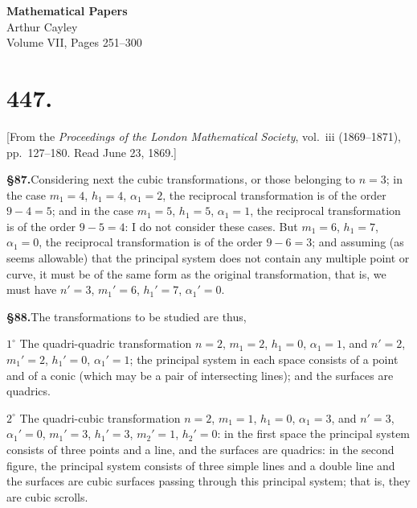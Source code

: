 \documentclass[11pt,a4paper]{article}
\begin{document}
\begin{center}
  {\LARGE\bfseries Mathematical Papers}\\[0.5em]
  {\Large Arthur Cayley}\\[1em]
  {\large Volume VII, Pages 251--300}
\end{center}

\vspace{2em}


\section*{\textbf{447.}}

[From the \textit{Proceedings of the London Mathematical Society}, vol.~iii (1869--1871), pp.~127--180. Read June 23, 1869.]

\textbf{\S 87.}\quad Considering next the cubic transformations, or those belonging to $n = 3$; in the case $m_1 = 4$, $h_1 = 4$, $\alpha_1 = 2$, the reciprocal transformation is of the order $9 - 4 = 5$; and in the case $m_1 = 5$, $h_1 = 5$, $\alpha_1 = 1$, the reciprocal transformation is of the order $9 - 5 = 4$: I do not consider these cases. But $m_1 = 6$, $h_1 = 7$, $\alpha_1 = 0$, the reciprocal transformation is of the order $9 - 6 = 3$; and assuming (as seems allowable) that the principal system does not contain any multiple point or curve, it must be of the same form as the original transformation, that is, we must have $n' = 3$, $m_1' = 6$, $h_1' = 7$, $\alpha_1' = 0$.

\textbf{\S 88.}\quad The transformations to be studied are thus,

$1^{\circ}$ The quadri-quadric transformation $n = 2$, $m_1 = 2$, $h_1 = 0$, $\alpha_1 = 1$, and $n' = 2$, $m_1' = 2$, $h_1' = 0$, $\alpha_1' = 1$; the principal system in each space consists of a point and of a conic (which may be a pair of intersecting lines); and the surfaces are quadrics.

$2^{\circ}$ The quadri-cubic transformation $n = 2$, $m_1 = 1$, $h_1 = 0$, $\alpha_1 = 3$, and $n' = 3$, $\alpha_1' = 0$, $m_1' = 3$, $h_1' = 3$, $m_2' = 1$, $h_2' = 0$: in the first space the principal system consists of three points and a line, and the surfaces are quadrics: in the second figure, the principal system consists of three simple lines and a double line and the surfaces are cubic surfaces passing through this principal system; that is, they are cubic scrolls.
\end{document}
